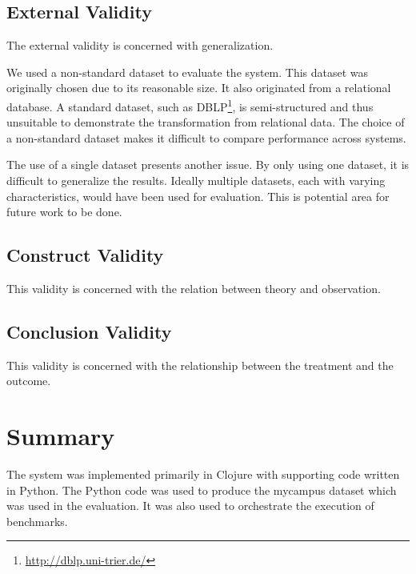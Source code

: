 		\subsection{External Validity}
		\label{sec:external-validity}
			\begin{displayquote}
				The external validity is concerned with generalization.
			\end{displayquote}
			
			We used a non-standard dataset to evaluate the system.  This dataset was originally chosen due to its reasonable size.  It also originated from a relational database.  A standard dataset, such as DBLP\footnote{\url{http://dblp.uni-trier.de/}}, is semi-structured and thus unsuitable to demonstrate the transformation from relational data.  The choice of a non-standard dataset makes it difficult to compare performance across systems.
			
			The use of a single dataset presents another issue.  By only using one dataset, it is difficult to generalize the results.  Ideally multiple datasets, each with varying characteristics, would have been used for evaluation.  This is potential area for future work to be done.
		
		\subsection{Construct Validity}
		\label{sec:construct-validity}
			\begin{displayquote}
				This validity is concerned with the relation between theory and observation.
			\end{displayquote}
		
		\subsection{Conclusion Validity}
		\label{sec:conclusion-validity}
			\begin{displayquote}
				This validity is concerned with the relationship between the treatment and the outcome.
			\end{displayquote}
	
	\section{Summary}
	\label{sec:eval-summary}
		The system was implemented primarily in Clojure with supporting code written in Python.  The Python code was used to produce the mycampus dataset which was used in the evaluation.  It was also used to orchestrate the execution of benchmarks.
		

